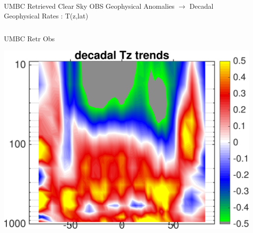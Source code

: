\documentclass[10pt,t]{beamer}
\begin{document}
\begin{frame}{UMBC Retrieved Clear Sky OBS Geophysical Anomalies $\rightarrow$ Decadal Geophysical Rates : T(z,lat)}
\begin{columns}
\begin{column}{0.45\columnwidth}
\begin{block}{\footnotesize UMBC Retr Obs}
\vspace{-0.1in}
\begin{center}
\includegraphics[width=\linewidth]{Figs/ClearAnom/umbc_clr_retr_obs_wv_rate_200209_201808.png}
\end{center}
\end{block}
\end{column}


\end{columns}
\end{frame}
\end{document}
